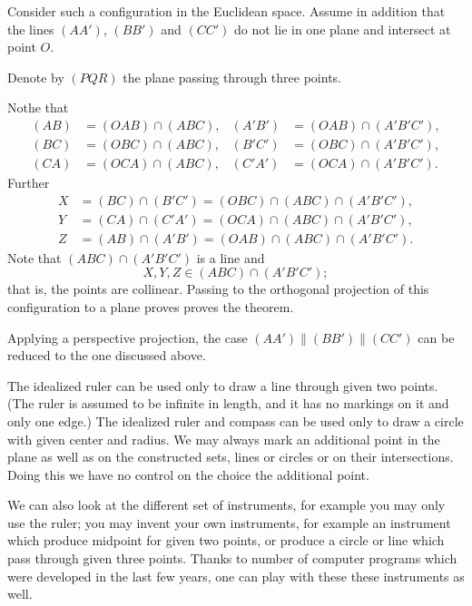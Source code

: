 Consider such a configuration in the Euclidean space.
Assume in addition that the lines $(AA')$, $(BB')$ and $(CC')$ do not lie in one plane and intersect at point $O$.

Denote by $(PQR)$ the plane passing through three points.

Nothe that
\begin{align*}
(AB)&= (OAB)\cap (ABC),&
(A'B')&= (OAB)\cap (A'B'C'),\\
(BC)&= (OBC)\cap (ABC),&
(B'C')&= (OBC)\cap (A'B'C'),\\
(CA)&= (OCA)\cap (ABC),&
(C'A')&= (OCA)\cap (A'B'C').
\end{align*}
Further
\begin{align*}
X&=(BC)\cap(B'C')=(OBC)\cap (ABC)\cap (A'B'C'),\\
Y&=(CA)\cap(C'A')=(OCA)\cap (ABC)\cap (A'B'C'),\\
Z&=(AB)\cap(A'B')=(OAB)\cap (ABC)\cap (A'B'C').
\end{align*}
Note that $(ABC)\cap (A'B'C')$ is a line and
\[X,Y,Z\in (ABC)\cap (A'B'C');\]
that is, the points are collinear. 
Passing  to the orthogonal projection of this configuration to a plane proves proves the theorem.

Applying a perspective projection,
the case $(AA')\parallel(BB')\parallel(CC')$ 
can be reduced to the one discussed above.
\qeds

















The idealized ruler can be used only to draw a line through given two points. (The ruler is assumed to be infinite in length, and it has no markings on it and only one edge.)
The idealized ruler and compass can be used only to draw a circle with given center and radius.
We may always mark an additional point in the plane
as well as on the constructed sets, lines or circles or on their intersections.
Doing this we have no control on the choice the additional point. 

We can also look at the different set of instruments, 
for example
you may only use the ruler;
you may invent your own instruments, for example an instrument which produce midpoint for given two points, 
or produce a circle or line which pass through given three points.
Thanks to number of computer programs which were developed in the last few years, one can play with these these instruments as well.

